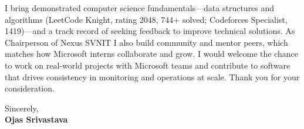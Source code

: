 \documentclass[a4paper,11pt]{article}
\begin{document}
I bring demonstrated computer science fundamentals---data structures and algorithms (LeetCode Knight, rating 2048, 744+ solved; Codeforces Specialist, 1419)---and a track record of seeking feedback to improve technical solutions. As Chairperson of Nexus SVNIT I also build community and mentor peers, which matches how Microsoft interns collaborate and grow. I would welcome the chance to work on real-world projects with Microsoft teams and contribute to software that drives consistency in monitoring and operations at scale. Thank you for your consideration.

Sincerely, \\
\vspace{8mm}
\textbf{Ojas Srivastava}
\end{document}
